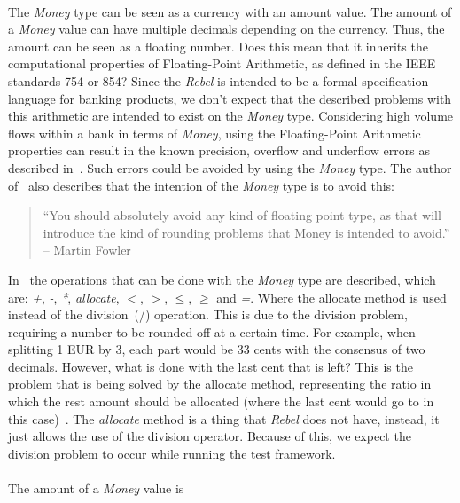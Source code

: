 \\
The \textit{Money} type can be seen as a currency with an amount value. The
amount of a \textit{Money} value can have multiple decimals depending on the
currency. Thus, the amount can be seen as a floating number. Does this mean that
it inherits the computational properties of Floating-Point Arithmetic, as defined
in the IEEE standards 754 or 854? Since the \textit{Rebel} is intended to be a
formal specification language for banking products, we don't expect that the
described problems with this arithmetic are intended to exist on the
\textit{Money} type. Considering high volume flows within a bank in terms
of \textit{Money}, using the Floating-Point Arithmetic properties can result in
the known precision, overflow and underflow errors as described
in~\cite{goldberg1991every}. Such errors could be avoided by using the
\textit{Money} type. The author of~\cite{fowler2002patterns} also describes that
the intention of the \textit{Money} type is to avoid this:
\begin{quote}
	``You should absolutely avoid any kind of floating point type, as that will
	introduce the kind of rounding problems that Money is intended to avoid.''
    -- Martin Fowler~\cite{fowler2002patterns}
\end{quote}
%
In~\cite{fowler2002patterns} the operations that can be done with the
\textit{Money} type are described, which are: \textit{+}, \textit{-},
\textit{*}, \textit{allocate}, \textit{$<$}, \textit{$>$}, \textit{$\leq$},
\textit{$\geq$} and \textit{=}. Where the allocate method is used instead of the
division~(/) operation. This is due to the division problem, requiring a number
to be rounded off at a certain time. For example, when splitting 1 EUR by 3,
each part would be 33 cents with the consensus of two decimals. However, what is done with the last cent
that is left? This is the problem that is being solved by the allocate method,
representing the ratio in which the rest amount should be allocated (where the last
cent would go to in this case)~\cite{fowler2002patterns}. The \textit{allocate}
method is a thing that \textit{Rebel} does not have, instead, it just allows the
use of the division operator. Because of this, we expect the division problem to
occur while running the test framework.\\
\\
The amount of a \textit{Money} value is
